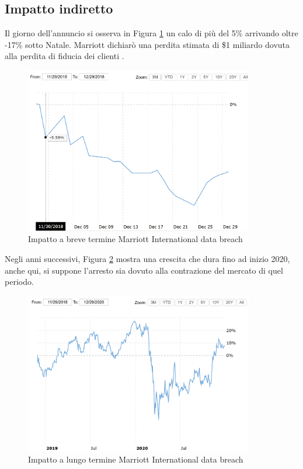 \documentclass[12pt,a4paper,twoside]{report}
\begin{document}
\subsection{Impatto indiretto}
Il giorno dell'annuncio si osserva in Figura \ref{fig:mrt1} \cite{macrotrends_marriott} un calo di pi\`u del 5\% arrivando oltre  -17\% sotto Natale. Marriott dichiar\`o una perdita stimata di \$1 miliardo dovuta alla perdita di fiducia dei clienti \cite{Marriott_ResGate}.\\

\begin{figure}[H] 
\begin{center} 
\includegraphics[width=10cm]{figures/marriott_short.png} 
\caption[Grafico Marriott short]{Impatto a breve termine Marriott International data breach}\label{fig:mrt1}
\end{center}
\end{figure}

Negli anni successivi, Figura \ref{fig:mrt2} \cite{macrotrends_marriott} mostra una crescita che dura fino ad inizio 2020, anche qui, si suppone l'arresto sia dovuto alla contrazione del mercato di quel periodo.\\

\begin{figure}[H] 
\begin{center} 
\includegraphics[width=10cm]{figures/marriott_long.png} 
\caption[Grafico Marriott long]{Impatto a lungo termine  Marriott International data breach}\label{fig:mrt2}
\end{center}
\end{figure}
\end{document}
